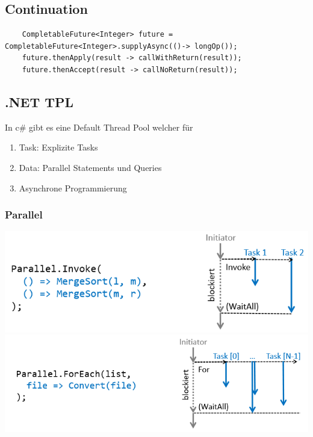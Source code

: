 \subsection{Continuation}
\begin{lstlisting}
	CompletableFuture<Integer> future = CompletableFuture<Integer>.supplyAsync(()-> longOp());
	future.thenApply(result -> callWithReturn(result));
	future.thenAccept(result -> callNoReturn(result));
\end{lstlisting}


\subsection{.NET TPL}
In c\# gibt es eine Default Thread Pool welcher für 
\begin{enumerate}[nosep]
	\item Task: Explizite Tasks
	\item Data: Parallel Statements und Queries
	\item Asynchrone Programmierung
\end{enumerate}

\subsubsection{Parallel}
\includegraphics[width=\columnwidth]{Images/parallel_invoke}
\includegraphics[width=\columnwidth]{Images/parallel_loop}
